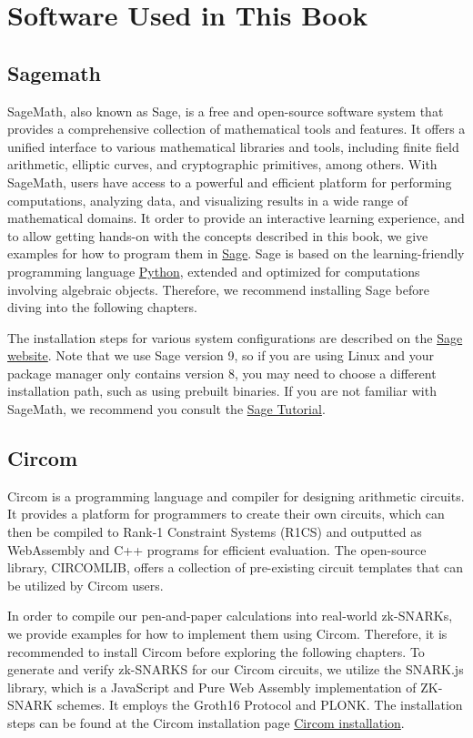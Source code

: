 \chapter{Software Used in This Book}

\section{Sagemath}
\label{sagemath_setup}
SageMath, also known as Sage, is a free and open-source software system that provides a comprehensive collection of mathematical tools and features. It offers a unified interface to various mathematical libraries and tools, including finite field arithmetic, elliptic curves, and cryptographic primitives, among others. With SageMath, users have access to a powerful and efficient platform for performing computations, analyzing data, and visualizing results in a wide range of mathematical domains. It order to provide an interactive learning experience, and to allow getting hands-on with the concepts described in this book, we give examples for how to program them in \href{https://www.sagemath.org/}{Sage}. Sage is based on the learning-friendly programming language \href{https://www.python.org/}{Python},  extended and optimized for computations involving algebraic objects. Therefore, we recommend installing Sage before diving into the following chapters.

The installation steps for various system configurations are described on the \href{https://doc.sagemath.org/html/en/installation/index.html}{Sage website}. Note that we use Sage version 9, so if you are using Linux and your package manager only contains version 8, you may need to choose a different installation path, such as using prebuilt binaries. If you are not familiar with SageMath, we recommend you consult the \href{https://doc.sagemath.org/html/en/tutorial/index.html}{Sage Tutorial}.

\section{Circom}
\label{circom_setup}
Circom is a programming language and compiler for designing arithmetic circuits. It provides a platform for programmers to create their own circuits, which can then be compiled to Rank-1 Constraint Systems (R1CS) and outputted as WebAssembly and C++ programs for efficient evaluation. The open-source library, CIRCOMLIB, offers a collection of pre-existing circuit templates that can be utilized by Circom users.

In order to compile our pen-and-paper calculations into real-world zk-SNARKs, we provide examples for how to implement them using Circom. Therefore, it is recommended to install Circom before exploring the following chapters. To generate and verify zk-SNARKS for our Circom circuits, we utilize the SNARK.js library, which is a JavaScript and Pure Web Assembly implementation of ZK-SNARK schemes. It employs the Groth16 Protocol and PLONK. The installation steps can be found at the Circom installation page \href{https://docs.circom.io/getting-started/installation/#installing-circom}{Circom installation}.

